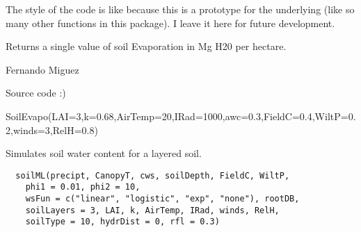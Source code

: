 \documentclass[letterpaper]{book}
\begin{document}
%
\begin{Details}\relax
The style of the code is  like because this is a
prototype for the underlying  (like so many other
functions in this package). I leave it here for future
development.
\end{Details}
%
\begin{Value}
Returns a single value of soil Evaporation in Mg H20 per
hectare.
\end{Value}
%
\begin{Author}\relax
Fernando Miguez
\end{Author}
%
\begin{SeeAlso}\relax
Source code :)
\end{SeeAlso}
%
\begin{Examples}
\begin{ExampleCode}
SoilEvapo(LAI=3,k=0.68,AirTemp=20,IRad=1000,awc=0.3,FieldC=0.4,WiltP=0.2,winds=3,RelH=0.8)
\end{ExampleCode}
\end{Examples}
%
\begin{Description}\relax
Simulates soil water content for a layered soil.
\end{Description}
%
\begin{Usage}
\begin{verbatim}
  soilML(precipt, CanopyT, cws, soilDepth, FieldC, WiltP,
    phi1 = 0.01, phi2 = 10,
    wsFun = c("linear", "logistic", "exp", "none"), rootDB,
    soilLayers = 3, LAI, k, AirTemp, IRad, winds, RelH,
    soilType = 10, hydrDist = 0, rfl = 0.3)
\end{verbatim}
\end{Usage}
%
\end{document}
